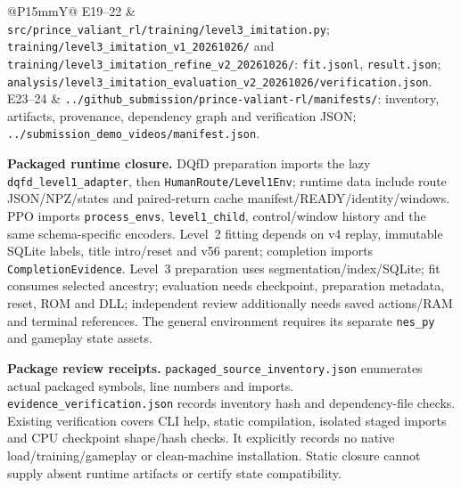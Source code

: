 \documentclass[11pt,a4paper]{article}
\newcommand{\pathref}[1]{\nolinkurl{#1}}
\begin{document}
\begin{tabularx}{\linewidth}{@{}P{15mm}Y@{}}
E19--22 & \pathref{src/prince_valiant_rl/training/level3_imitation.py}; \pathref{training/level3_imitation_v1_20261026/} and \pathref{training/level3_imitation_refine_v2_20261026/}: \texttt{fit.jsonl}, \texttt{result.json}; \pathref{analysis/level3_imitation_evaluation_v2_20261026/verification.json}.\\
E23--24 & \pathref{../github_submission/prince-valiant-rl/manifests/}: inventory, artifacts, provenance, dependency graph and verification JSON; \pathref{../submission_demo_videos/manifest.json}.\\\bottomrule
\end{tabularx}

\textbf{Packaged runtime closure.} DQfD preparation imports the lazy \pathref{dqfd_level1_adapter}, then \pathref{HumanRoute/Level1Env}; runtime data include route JSON/NPZ/states and paired-return cache manifest/READY/identity/windows. PPO imports \texttt{process\_envs}, \texttt{level1\_child}, control/window history and the same schema-specific encoders. Level~2 fitting depends on v4 replay, immutable SQLite labels, title intro/reset and v56 parent; completion imports \texttt{CompletionEvidence}. Level~3 preparation uses segmentation/index/SQLite; fit consumes selected ancestry; evaluation needs checkpoint, preparation metadata, reset, ROM and DLL; independent review additionally needs saved actions/RAM and terminal references. The general environment requires its separate \texttt{nes\_py} and gameplay state assets.

\textbf{Package review receipts.} \pathref{packaged_source_inventory.json} enumerates actual packaged symbols, line numbers and imports. \pathref{evidence_verification.json} records inventory hash and dependency-file checks. Existing verification covers CLI help, static compilation, isolated staged imports and CPU checkpoint shape/hash checks. It explicitly records no native load/training/gameplay or clean-machine installation. Static closure cannot supply absent runtime artifacts or certify state compatibility.
\end{document}
